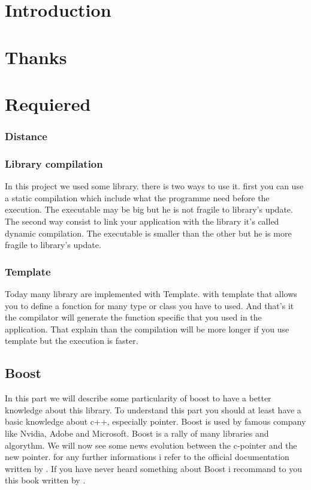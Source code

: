 \documentclass[a4paper,11pt]{report}
\begin{document}
\chapter{Introduction}
\chapter{Thanks}
\chapter{Requiered}
\subsection{Distance}

\subsection{Library compilation}
       In this project we used some library. there is two ways to use it.
       first you can use a static compilation which include what the programme need before the execution. The executable may be big but he is not fragile to library's update.
       The second way consist to link your application with the library it's called dynamic compilation. The executable is smaller than the other but he is more fragile to library's update.
       
\subsection{Template}
       Today many library are implemented with Template. with template that allows you to define a fonction for many type or class you have to used. And that's it the compilator will generate the function specific that you used in the application. That explain than the compilation will be more longer if you use template but the execution is faster.

\section{Boost}
In this part we will describe some particularity of boost to have a better knowledge about this library.
To understand this part you should at least have a basic knowledge about c++, especially pointer.
Boost is used by famous company like Nvidia, Adobe and Microsoft.
Boost is a rally of many libraries and algorythm.
We will now see some news evolution between the c-pointer and the new pointer.
for any further informations i refer to the official documentation written by \cite{boostdocumentation}.
If you have never heard something about Boost i recommand to you this book written by \cite{introductionboost}. %
\end{document}
